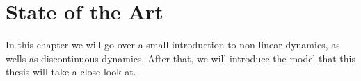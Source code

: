 \chapter{State of the Art}
\label{chap:state}

In this chapter we will go over a small introduction to non-linear dynamics, as wells as discontinuous dynamics.
After that, we will introduce the model that this thesis will take a close look at.






%

